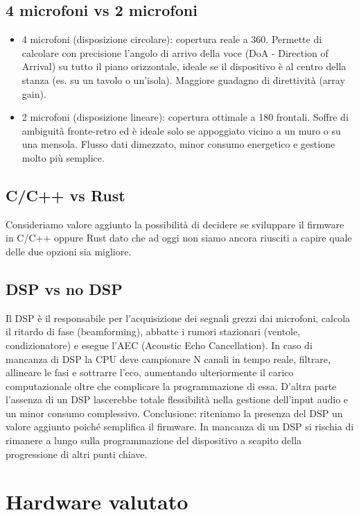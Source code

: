 \documentclass[12pt,a4paper]{article}
\newcommand{\tightlist}{\setlength{\itemsep}{1pt}\setlength{\parskip}{0pt}}
\begin{document}
\subsection{4 microfoni vs 2 microfoni}
\begin{itemize}
\tightlist
\item 4 microfoni (disposizione circolare): copertura reale a 360\textdegree. Permette di calcolare con precisione l'angolo di arrivo della voce (DoA - Direction of Arrival) su tutto il piano orizzontale, ideale se il dispositivo è al centro della stanza (es. su un tavolo o un'isola). Maggiore guadagno di direttività (array gain).
\item 2 microfoni (disposizione lineare): copertura ottimale a 180\textdegree{} frontali. Soffre di ambiguità fronte-retro ed è ideale solo se appoggiato vicino a un muro o su una mensola. Flusso dati dimezzato, minor consumo energetico e gestione molto più semplice.
\end{itemize}

\subsection{C/C++ vs Rust}
Consideriamo valore aggiunto la possibilità di decidere se sviluppare il firmware in C/C++ oppure Rust dato che ad oggi non siamo ancora riusciti a capire quale delle due opzioni sia migliore.


\subsection{DSP vs no DSP}
Il DSP è il responsabile per l'acquisizione dei segnali grezzi dai microfoni, calcola il ritardo di fase (beamforming), abbatte i rumori stazionari (ventole, condizionatore) e esegue l'AEC (Acoustic Echo Cancellation).
In caso di mancanza di DSP la CPU deve campionare N canali in tempo reale, filtrare, allineare le fasi e sottrarre l'eco, aumentando ulteriormente il carico computazionale oltre che complicare la programmazione di essa.
D'altra parte l'assenza di un DSP lascerebbe totale flessibilità nella gestione dell'input audio e un minor consumo complessivo.
Conclusione: riteniamo la presenza del DSP un valore aggiunto poiché semplifica il firmware. In mancanza di un DSP si rischia di rimanere a lungo sulla programmazione del dispositivo a scapito della progressione di altri punti chiave.

\section{Hardware valutato}
\end{document}
